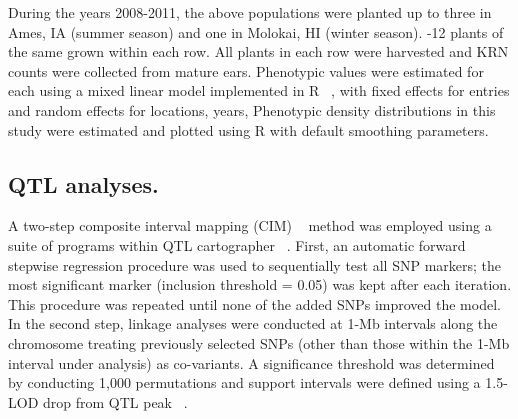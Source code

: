 \documentclass[10pt,letterpaper]{article}
\begin{document}
During the years 2008-2011, \DIFdelbegin {}\DIFdelend the above populations were planted \DIFdelbegin {}\DIFdelend \DIFaddbegin {}\DIFaddend up to three \DIFdelbegin {}\DIFdelend \DIFaddbegin {}\DIFaddend in Ames, IA (summer season) and one \DIFdelbegin {}\DIFdelend \DIFaddbegin {}\DIFaddend in Molokai, HI (winter season). \DIFdelbegin {}\DIFdelend \DIFaddbegin {}-12 plants of the same \DIFdelbegin {}\DIFdelend \DIFaddbegin {}\DIFaddend grown within each row. \DIFaddbegin {}\DIFaddend All plants in each row were harvested and KRN counts were collected from mature ears. Phenotypic values were estimated for each \DIFdelbegin {}\DIFdelend \DIFaddbegin {}\DIFaddend using a mixed linear model implemented in R ~\cite{DevelopmentCoreTeam2011}, with fixed effects for entries and random effects for \DIFdelbegin {}\DIFdelend locations, years, \DIFdelbegin {}\DIFdelend \DIFaddbegin {}\DIFaddend Phenotypic density distributions in this study were estimated and plotted using R with default smoothing parameters. 

\subsection*{QTL analyses.}
A two-step composite interval mapping (CIM) ~\cite{Zeng1993} method was employed using a suite of programs within QTL cartographer ~\cite{DaCostaE.Silva2012}. First, an automatic forward stepwise regression procedure was used to sequentially test all SNP markers; the most significant marker (inclusion threshold = 0.05) was kept after each iteration. This procedure was repeated until none of the added SNPs improved the model. In the second step, linkage analyses were conducted at 1-Mb intervals along the chromosome treating previously selected SNPs (other than those within the 1-Mb interval under analysis) as co-variants. A significance threshold was determined by conducting 1,000 permutations and support intervals were defined using a 1.5-LOD drop from QTL peak ~\cite{Lander1989}.
\end{document}
